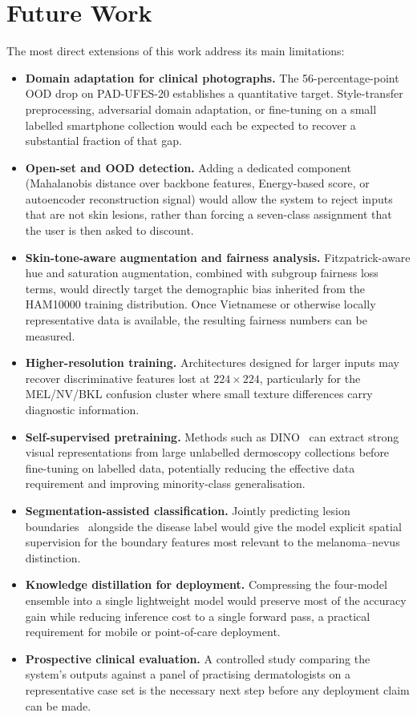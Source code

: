 \section{Future Work}

The most direct extensions of this work address its main limitations:

\begin{itemize}
    \item \textbf{Domain adaptation for clinical photographs.} The 56-percentage-point OOD drop on PAD-UFES-20 establishes a quantitative target. Style-transfer preprocessing, adversarial domain adaptation, or fine-tuning on a small labelled smartphone collection would each be expected to recover a substantial fraction of that gap.
    \item \textbf{Open-set and OOD detection.} Adding a dedicated component (Mahalanobis distance over backbone features, Energy-based score, or autoencoder reconstruction signal) would allow the system to reject inputs that are not skin lesions, rather than forcing a seven-class assignment that the user is then asked to discount.
    \item \textbf{Skin-tone-aware augmentation and fairness analysis.} Fitzpatrick-aware hue and saturation augmentation, combined with subgroup fairness loss terms, would directly target the demographic bias inherited from the HAM10000 training distribution. Once Vietnamese or otherwise locally representative data is available, the resulting fairness numbers can be measured.
    \item \textbf{Higher-resolution training.} Architectures designed for larger inputs may recover discriminative features lost at $224 \times 224$, particularly for the MEL/NV/BKL confusion cluster where small texture differences carry diagnostic information.
    \item \textbf{Self-supervised pretraining.} Methods such as DINO~\cite{caron2021dino} can extract strong visual representations from large unlabelled dermoscopy collections before fine-tuning on labelled data, potentially reducing the effective data requirement and improving minority-class generalisation.
    \item \textbf{Segmentation-assisted classification.} Jointly predicting lesion boundaries~\cite{hasan2020dsnet} alongside the disease label would give the model explicit spatial supervision for the boundary features most relevant to the melanoma--nevus distinction.
    \item \textbf{Knowledge distillation for deployment.} Compressing the four-model ensemble into a single lightweight model would preserve most of the accuracy gain while reducing inference cost to a single forward pass, a practical requirement for mobile or point-of-care deployment.
    \item \textbf{Prospective clinical evaluation.} A controlled study comparing the system's outputs against a panel of practising dermatologists on a representative case set is the necessary next step before any deployment claim can be made.
\end{itemize}
